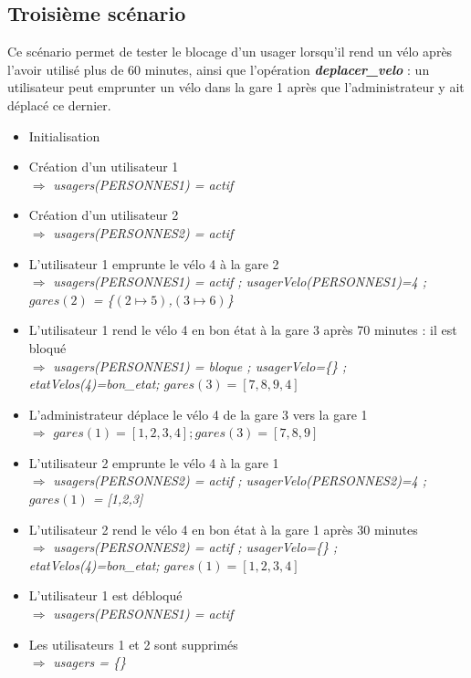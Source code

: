 \documentclass[12pt]{article}
\begin{document}
\subsection{Troisième scénario}
Ce scénario permet de tester le blocage d'un usager lorsqu'il rend un vélo après l'avoir utilisé plus de 60 minutes, ainsi que l'opération \textit{\textbf{deplacer\_velo}} : un utilisateur peut emprunter un vélo dans la gare 1 après que l'administrateur y ait déplacé ce dernier.
\begin{itemize}
  \item Initialisation
  \item Création d'un utilisateur 1 \\
  $\Rightarrow$ \textit{usagers(PERSONNES1) = actif}
  \item Création d'un utilisateur 2 \\
  $\Rightarrow$ \textit{usagers(PERSONNES2) = actif}
  \item L'utilisateur 1 emprunte le vélo 4 à la gare 2 \\
  $\Rightarrow$ \textit{usagers(PERSONNES1) = actif ; usagerVelo(PERSONNES1)=4 ; $gares(2)$ = \{$(2\mapsto5)$,$(3\mapsto6)$\}}
  \item L'utilisateur 1 rend le vélo 4 en bon état à la gare 3 après 70 minutes : il est bloqué \\
  $\Rightarrow$ \textit{usagers(PERSONNES1) = bloque ; usagerVelo=\{\} ; etatVelos(4)=bon\_etat; $gares(3) = [7,8,9,4]$}
  \item L'administrateur déplace le vélo 4 de la gare 3 vers la gare 1 \\
  $\Rightarrow$ \textit{$gares(1) = [1,2,3,4] ; gares(3) = [7,8,9]$}
  \item L'utilisateur 2 emprunte le vélo 4 à la gare 1 \\
  $\Rightarrow$ \textit{usagers(PERSONNES2) = actif ; usagerVelo(PERSONNES2)=4 ; $gares(1)$ = [1,2,3]}
  \item L'utilisateur 2 rend le vélo 4 en bon état à la gare 1 après 30 minutes \\
  $\Rightarrow$ \textit{usagers(PERSONNES2) = actif ; usagerVelo=\{\} ; etatVelos(4)=bon\_etat; $gares(1) = [1,2,3,4]$}
  \item L'utilisateur 1 est débloqué \\
  $\Rightarrow$ \textit{usagers(PERSONNES1) = actif}
  \item Les utilisateurs 1 et 2 sont supprimés \\
  $\Rightarrow$ \textit{usagers = \{\}}
\end{itemize}
\newpage
\end{document}
